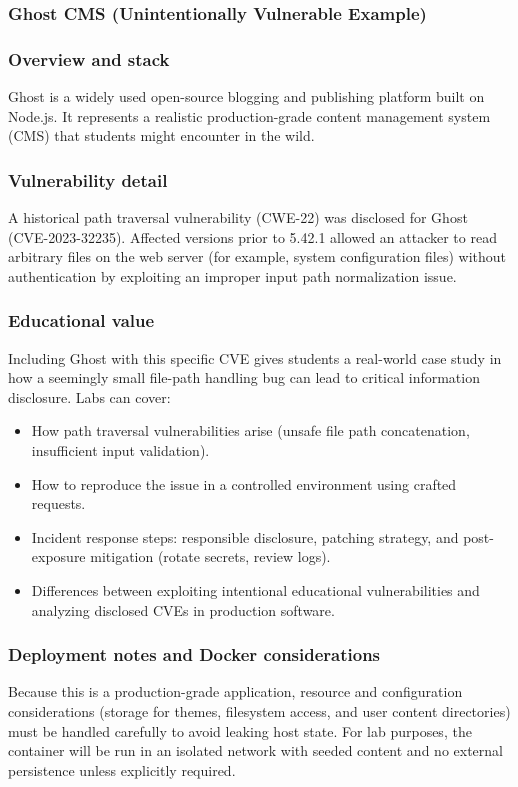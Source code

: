 \documentclass[12pt,titlepage]{article}
\begin{document}
\subsubsection{Ghost CMS (Unintentionally Vulnerable Example)}
\subsubsection*{Overview and stack}
Ghost is a widely used open-source blogging and publishing platform built on Node.js. It represents a realistic production-grade content management system (CMS) that students might encounter in the wild.

\subsubsection*{Vulnerability detail}
A historical path traversal vulnerability (CWE-22) was disclosed for Ghost (CVE-2023-32235). Affected versions prior to 5.42.1 allowed an attacker to read arbitrary files on the web server (for example, system configuration files) without authentication by exploiting an improper input path normalization issue.

\subsubsection*{Educational value}
Including Ghost with this specific CVE gives students a real-world case study in how a seemingly small file-path handling bug can lead to critical information disclosure. Labs can cover:
\begin{itemize}
    \item How path traversal vulnerabilities arise (unsafe file path concatenation, insufficient input validation).
    \item How to reproduce the issue in a controlled environment using crafted requests.
    \item Incident response steps: responsible disclosure, patching strategy, and post-exposure mitigation (rotate secrets, review logs).
    \item Differences between exploiting intentional educational vulnerabilities and analyzing disclosed CVEs in production software.
\end{itemize}

\subsubsection*{Deployment notes and Docker considerations}
Because this is a production-grade application, resource and configuration considerations (storage for themes, filesystem access, and user content directories) must be handled carefully to avoid leaking host state. For lab purposes, the container will be run in an isolated network with seeded content and no external persistence unless explicitly required.
\end{document}
